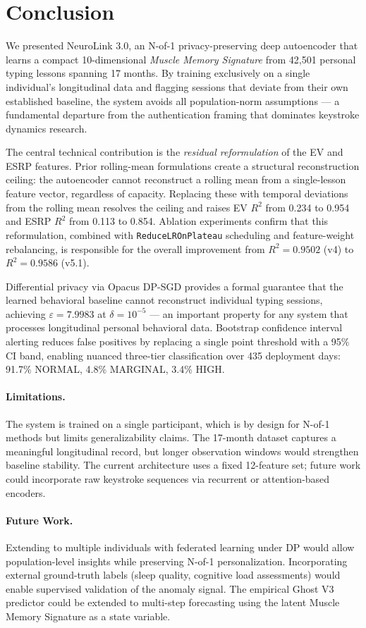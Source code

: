 \section{Conclusion}
\label{sec:conclusion}

We presented NeuroLink 3.0, an N-of-1 privacy-preserving deep autoencoder
that learns a compact 10-dimensional \emph{Muscle Memory Signature} from
42,501 personal typing lessons spanning 17 months.
By training exclusively on a single individual's longitudinal data and
flagging sessions that deviate from their own established baseline,
the system avoids all population-norm assumptions — a fundamental departure
from the authentication framing that dominates keystroke dynamics research.

The central technical contribution is the \emph{residual reformulation} of
the EV and ESRP features.
Prior rolling-mean formulations create a structural reconstruction ceiling:
the autoencoder cannot reconstruct a rolling mean from a single-lesson
feature vector, regardless of capacity.
Replacing these with temporal deviations from the rolling mean resolves
the ceiling and raises EV $R^2$ from 0.234 to 0.954 and ESRP $R^2$ from
0.113 to 0.854.
Ablation experiments confirm that this reformulation, combined with
\texttt{ReduceLROnPlateau} scheduling and feature-weight rebalancing,
is responsible for the overall improvement from $R^2{=}0.9502$ (v4) to
$R^2{=}0.9586$ (v5.1).

Differential privacy via Opacus DP-SGD provides a formal guarantee that the
learned behavioral baseline cannot reconstruct individual typing sessions,
achieving $\varepsilon{=}7.9983$ at $\delta{=}10^{-5}$ — an important property
for any system that processes longitudinal personal behavioral data.
Bootstrap confidence interval alerting reduces false positives by replacing a
single point threshold with a 95\% CI band, enabling nuanced three-tier
classification over 435 deployment days: 91.7\% NORMAL, 4.8\% MARGINAL, 3.4\% HIGH.

\paragraph{Limitations.}
The system is trained on a single participant, which is by design for N-of-1
methods but limits generalizability claims.
The 17-month dataset captures a meaningful longitudinal record, but longer
observation windows would strengthen baseline stability.
The current architecture uses a fixed 12-feature set; future work could
incorporate raw keystroke sequences via recurrent or attention-based encoders.

\paragraph{Future Work.}
Extending to multiple individuals with federated learning under DP would
allow population-level insights while preserving N-of-1 personalization.
Incorporating external ground-truth labels (sleep quality, cognitive load
assessments) would enable supervised validation of the anomaly signal.
The empirical Ghost V3 predictor could be extended to multi-step forecasting
using the latent Muscle Memory Signature as a state variable.
